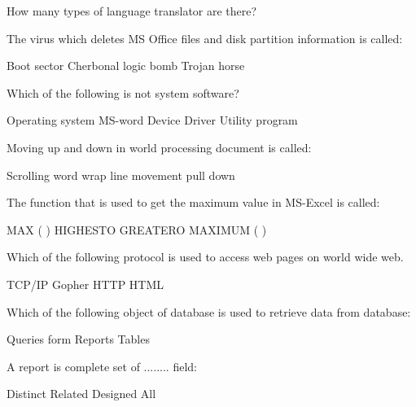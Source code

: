 \documentclass{exam}
\begin{document}
\begin{questions}
How many types of language translator are there?\\
\begin{oneparchoices}
\end{oneparchoices}
\question 

The virus which deletes MS Office files and disk partition information is called:\\
\begin{oneparchoices}
\choice Boot sector
\choice Cherbonal
\choice logic bomb
\choice Trojan horse
\end{oneparchoices}
\question 

Which of the following is not system software?\\
\begin{oneparchoices}
\choice Operating system
\choice MS-word
\choice Device Driver
\choice Utility program
\end{oneparchoices}
\question 

Moving up and down in world processing document is called:\\
\begin{oneparchoices}
\choice Scrolling
\choice word wrap
\choice line movement
\choice pull down
\end{oneparchoices}
\question 

The function that is used to get the maximum value in MS-Excel is called:\\
\begin{oneparchoices}
\choice MAX ( )
\choice HIGHESTO
\choice GREATERO
\choice MAXIMUM ( )
\end{oneparchoices}
\question 

Which of the following protocol is used to access web pages on world wide web.\\
\begin{oneparchoices}
\choice TCP/IP
\choice Gopher
\choice HTTP
\choice HTML
\end{oneparchoices}
\question 

Which of the following object of database is used to retrieve data from database:\\
\begin{oneparchoices}
\choice Queries
\choice form
\choice Reports
\choice Tables
\end{oneparchoices}
\question 

A report is complete set of ........ field:\\
\begin{oneparchoices}
\choice Distinct
\choice Related
\choice Designed
\choice All
\end{oneparchoices}
\question 


\end{questions}
\end{document}
